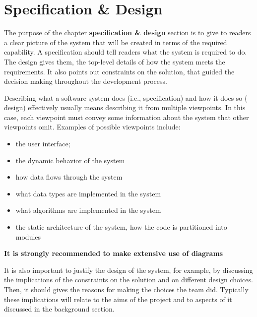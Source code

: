 
\chapter{Specification \& Design}\label{ch:specification-design}

The purpose of the chapter \textbf{specification \& design} section is to give to readers a clear picture of the system that will be created in terms of the required capability. A specification should tell readers what the system is required to do. The design gives them, the top-level details of how the system meets the requirements. It also points out constraints on the solution, that guided the decision making throughout the development process.


Describing what a software system does (i.e., specification) and how it does so (\ie{} design) effectively usually means describing it from multiple viewpoints. In this case, each viewpoint must convey some information about the system that other viewpoints omit. Examples of possible viewpoints include:

\begin{itemize}
  	\item the user interface;
	\item the dynamic behavior of the system
	\item how data flows through the system
	\item what data types are implemented in the system
	\item what algorithms are implemented in the system
	\item the static architecture of the system, \ie{} how the code is partitioned into modules
\end{itemize}

\textbf{It is strongly recommended to make extensive use of diagrams}

It is also important to justify the design of the system, for example, by discussing the implications of the constraints on the solution and on different design choices. Then, it should gives the reasons for making the choices the team did. Typically these implications will relate to the aims of the project and to aspects of it discussed in the background section.